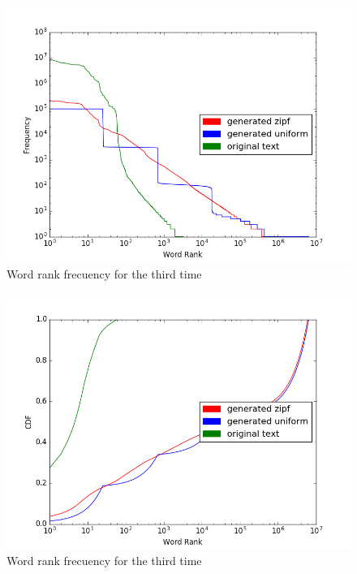 \documentclass{WeSTassignment}
\begin{document}
\begin{figure}[h!]
  \centering
  \includegraphics[scale=0.5]{word_rank_freq_3.png}
   \caption{Word rank frecuency for the third time}
     \label{fig:dig} 
\end{figure}

\begin{figure}[h!]
  \centering
  \includegraphics[scale=0.5]{cdf_3.png}
   \caption{Word rank frecuency for the third time}
     \label{fig:dig} 
\end{figure}




\end{document}
